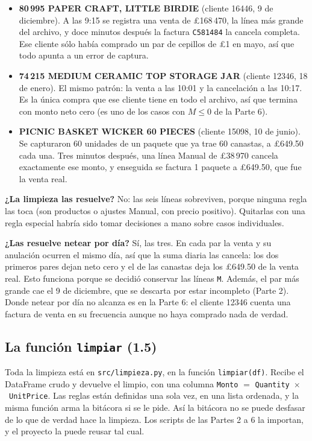 \documentclass[11pt,letterpaper]{article}
\newcommand{\code}[1]{\texttt{#1}}
\newenvironment{respuesta}{\par\medskip}{\par\medskip}
\begin{document}
\begin{itemize}[leftmargin=1.2em]
\item \textbf{80\,995 PAPER CRAFT, LITTLE BIRDIE} (cliente 16446, 9 de
diciembre). A las 9:15 se registra una venta de \pounds168\,470, la línea
más grande del archivo, y doce minutos después la factura \code{C581484}
la cancela completa. Ese cliente sólo había comprado un par de cepillos de
\pounds1 en mayo, así que todo apunta a un error de captura.
\item \textbf{74\,215 MEDIUM CERAMIC TOP STORAGE JAR} (cliente 12346, 18 de
enero). El mismo patrón: la venta a las 10:01 y la cancelación a las 10:17.
Es la única compra que ese cliente tiene en todo el archivo, así que termina
con monto neto cero (es uno de los casos con $M\le 0$ de la Parte 6).
\item \textbf{PICNIC BASKET WICKER 60 PIECES} (cliente 15098, 10 de junio).
Se capturaron 60 unidades de un paquete que ya trae 60 canastas, a
\pounds649.50 cada una. Tres minutos después, una línea Manual de
\pounds38\,970 cancela exactamente ese monto, y enseguida se factura 1
paquete a \pounds649.50, que fue la venta real.
\end{itemize}

\begin{respuesta}
\textbf{¿La limpieza las resuelve?} No: las seis líneas sobreviven, porque
ninguna regla las toca (son productos o ajustes Manual, con precio positivo).
Quitarlas con una regla especial habría sido tomar decisiones a mano sobre
casos individuales.

\textbf{¿Las resuelve netear por día?} Sí, las tres. En cada par la venta y
su anulación ocurren el mismo día, así que la suma diaria las cancela: los
dos primeros pares dejan neto cero y el de las canastas deja los
\pounds649.50 de la venta real. Esto funciona porque se decidió conservar las
líneas \code{M}. Además, el par más grande cae el 9 de diciembre, que se
descarta por estar incompleto (Parte 2). Donde netear por día no alcanza es
en la Parte 6: el cliente 12346 cuenta una factura de venta en su frecuencia
aunque no haya comprado nada de verdad.
\end{respuesta}

\subsection{La función \code{limpiar} (1.5)}

Toda la limpieza está en \code{src/limpieza.py}, en la función
\code{limpiar(df)}. Recibe el DataFrame crudo y devuelve el limpio, con una
columna \code{Monto} $=$ \code{Quantity}~$\times$~\code{UnitPrice}. Las
reglas están definidas una sola vez, en una lista ordenada, y la misma
función arma la bitácora si se le pide. Así la bitácora no se puede desfasar
de lo que de verdad hace la limpieza. Los scripts de las Partes 2 a 6 la
importan, y el proyecto la puede reusar tal cual.
\end{document}
